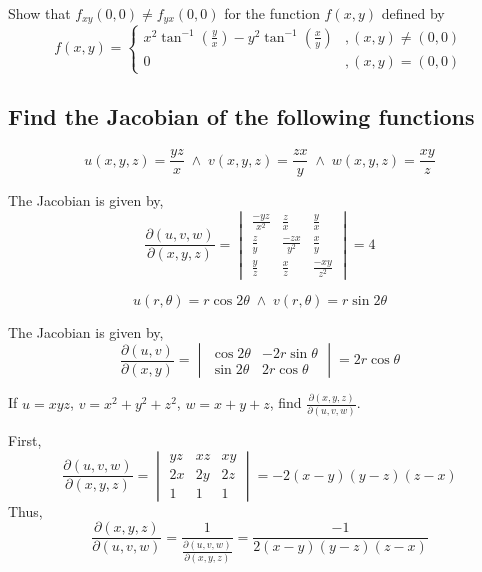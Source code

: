 \begin{asign}
	Show that $f_{xy}(0,0)\neq f_{yx}(0,0)$ for the function $f(x,y)$ defined by
	\[f(x,y)=\begin{cases}
		x^2\tan^{-1}\left(\frac{y}{x}\right)-y^2\tan^{-1}\left(\frac{x}{y}\right) &, (x,y)\neq (0,0)\\
		0 &, (x,y)= (0,0)
	\end{cases}\]
\end{asign}
\begin{anse}
	
\end{anse}
\subsection{Find the Jacobian of the following functions}
\begin{asign}
	\[u(x,y,z)=\frac{yz}{x} \; \land \; v(x,y,z)=\frac{zx}{y} \; \land \; w(x,y,z)=\frac{xy}{z}\]
\end{asign}
\begin{anse}
	The Jacobian is given by,
	\[\frac{\partial(u,v,w)}{\partial(x,y,z)}=\begin{vmatrix}
		\frac{-yz}{x^2} & \frac{z}{x} & \frac{y}{x}\\
		\frac{z}{y} & \frac{-zx}{y^2} & \frac{x}{y}\\
		\frac{y}{z} & \frac{x}{z} & \frac{-xy}{z^2}
	\end{vmatrix}=4\]
\end{anse}
\begin{asign}
	\[u(r,\theta)=r\cos2\theta \; \land \; v(r,\theta)=r\sin2\theta\]
\end{asign}
\begin{anse}
	The Jacobian is given by,
	\[\frac{\partial{(u,v)}}{\partial{(x,y)}}=\begin{vmatrix}
		\cos2\theta & -2r\sin\theta \\
		\sin2\theta & 2r\cos\theta
	\end{vmatrix}=2r\cos\theta \]
\end{anse}
\begin{asign}
	If $u=xyz$, $v=x^2+y^2+z^2$, $w=x+y+z$, find $\frac{\partial(x,y,z)}{\partial(u,v,w)}$.
\end{asign}
\begin{anse}
	First,
	\[\frac{\partial(u,v,w)}{\partial(x,y,z)}=\begin{vmatrix}
		yz & xz& xy\\
		2x& 2y & 2z\\
		1 & 1 & 1
	\end{vmatrix}=-2(x-y)(y-z)(z-x)\]
	Thus,
	\[\frac{\partial(x,y,z)}{\partial(u,v,w)}=\frac{1}{\frac{\partial(u,v,w)}{\partial(x,y,z)}}=\frac{-1}{2(x-y)(y-z)(z-x)}\]
\end{anse}
